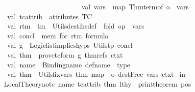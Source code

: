 \begin{isabellebody}
\ \ \ \ \ \ \ \ \ \ \ \ \ \ \ \ \ \ \ \ {\isacharbar}{\kern0pt}{\isachargreater}{\kern0pt}{\isachargreater}{\kern0pt}\ {\isacharhash}{\kern0pt}{}\isanewline
\ \ \ \ val\ vars{\isacharprime}{\kern0pt}\ {\isacharequal}{\kern0pt}\ map\ {\isacharparenleft}{\kern0pt}Thm{\isachardot}{\kern0pt}term{\isacharunderscore}{\kern0pt}of\ o\ {\isacharhash}{\kern0pt}{}{\isacharparenright}{\kern0pt}\ vars\isanewline
\ \ \ \ val\ tc{\isacharunderscore}{\kern0pt}attrib\ {\isacharequal}{\kern0pt}\ {\isacharat}{\kern0pt}{\isacharbraceleft}{\kern0pt}attributes\ {\isacharbrackleft}{\kern0pt}TC{\isacharbrackright}{\kern0pt}{\isacharbraceright}{\kern0pt}\isanewline
\ \ \ \ val\ r{\isacharunderscore}{\kern0pt}tm\ {\isacharequal}{\kern0pt}\ tm\ {\isacharbar}{\kern0pt}{\isachargreater}{\kern0pt}\ Utils{\isachardot}{\kern0pt}dest{\isacharunderscore}{\kern0pt}lhs{\isacharunderscore}{\kern0pt}def\ {\isacharbar}{\kern0pt}{\isachargreater}{\kern0pt}\ fold\ {\isacharparenleft}{\kern0pt}op\ {\isachardollar}{\kern0pt}{\isacharbackquote}{\kern0pt}{\isacharparenright}{\kern0pt}\ vars{\isacharprime}{\kern0pt}\isanewline
\ \ \ \ val\ concl\ {\isacharequal}{\kern0pt}\ \isactrlConst {\isasymopen}mem\ for\ r{\isacharunderscore}{\kern0pt}tm\ \isactrlConst {\isasymopen}formula{\isasymclose}{\isasymclose}\isanewline
\ \ \ \ val\ g\ {\isacharequal}{\kern0pt}\ Logic{\isachardot}{\kern0pt}list{\isacharunderscore}{\kern0pt}implies{\isacharparenleft}{\kern0pt}hyps{\isacharcomma}{\kern0pt}\ Utils{\isachardot}{\kern0pt}tp\ concl{\isacharparenright}{\kern0pt}\isanewline
\ \ \ \ val\ thm\ {\isacharequal}{\kern0pt}\ prove{\isacharunderscore}{\kern0pt}tc{\isacharunderscore}{\kern0pt}form\ g\ thm{\isacharunderscore}{\kern0pt}refs\ ctxt{}\isanewline
\ \ \ \ val\ name\ {\isacharequal}{\kern0pt}\ Binding{\isachardot}{\kern0pt}name\ {\isacharparenleft}{\kern0pt}def{\isacharunderscore}{\kern0pt}name\ {\isacharcircum}{\kern0pt}\ {\isachardoublequote}{\kern0pt}{\isacharunderscore}{\kern0pt}type{\isachardoublequote}{\kern0pt}{\isacharparenright}{\kern0pt}\isanewline
\ \ \ \ val\ thm\ {\isacharequal}{\kern0pt}\ Utils{\isachardot}{\kern0pt}fix{\isacharunderscore}{\kern0pt}vars\ thm\ {\isacharparenleft}{\kern0pt}map\ {\isacharparenleft}{\kern0pt}{\isacharhash}{\kern0pt}{}\ o\ dest{\isacharunderscore}{\kern0pt}Free{\isacharparenright}{\kern0pt}\ vars{\isacharprime}{\kern0pt}{\isacharparenright}{\kern0pt}\ ctxt{}\isanewline
\ in\isanewline
\ \ \ Local{\isacharunderscore}{\kern0pt}Theory{\isachardot}{\kern0pt}note\ {\isacharparenleft}{\kern0pt}{\isacharparenleft}{\kern0pt}name{\isacharcomma}{\kern0pt}\ tc{\isacharunderscore}{\kern0pt}attrib{\isacharparenright}{\kern0pt}{\isacharcomma}{\kern0pt}\ {\isacharbrackleft}{\kern0pt}thm{\isacharbrackright}{\kern0pt}{\isacharparenright}{\kern0pt}\ lthy\ {\isacharbar}{\kern0pt}{\isachargreater}{\kern0pt}\ print{\isacharunderscore}{\kern0pt}theorem\ pos\isanewline

\end{isabellebody}
